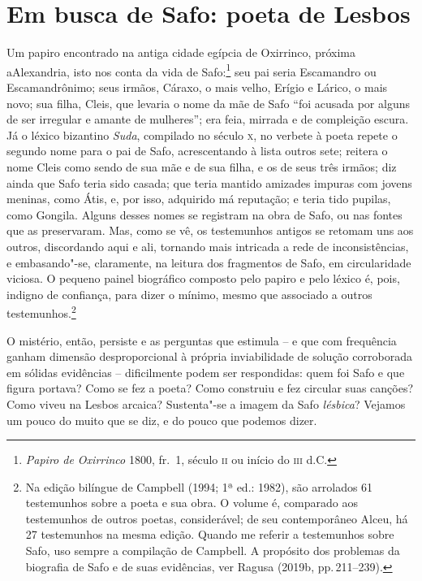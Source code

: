 \section*{Em busca de Safo: poeta de Lesbos}

Um papiro encontrado na antiga cidade egípcia de Oxirrinco, próxima a\EP[]
Alexandria, isto nos conta da vida de Safo:\footnote{\textit{Papiro de Oxirrinco} 1800,
fr.~1, século \textsc{ii} ou início do \textsc{iii} d.C.} seu pai seria Escamandro ou
Escamandrônimo; seus irmãos, Cáraxo, o mais velho, Erígio e Lárico, o mais
novo; sua filha, Cleis, que levaria o nome da mãe de Safo ``foi acusada
por alguns de ser irregular e amante de mulheres”; era feia, mirrada e de
compleição escura. Já o léxico bizantino \textit{Suda}, compilado no século \textsc{x},
no verbete à poeta repete o segundo nome para o pai de Safo, acrescentando à
lista outros sete; reitera o nome Cleis como sendo de sua mãe e de sua filha, e
os de seus três irmãos; diz ainda que Safo teria sido casada; que teria mantido
amizades impuras com jovens meninas, como Átis, e, por isso, adquirido má
reputação; e teria tido pupilas, como Gongila. Alguns desses nomes se registram
na obra de Safo, ou nas fontes que as preservaram. Mas, como se vê, os
testemunhos antigos se retomam uns aos outros, discordando aqui e ali, tornando
mais intricada a rede de inconsistências, e embasando"-se, claramente, na
leitura dos fragmentos de Safo, em circularidade viciosa. O pequeno painel
biográfico composto pelo papiro e pelo léxico é, pois, indigno de confiança,
para dizer o mínimo, mesmo que associado a outros testemunhos.\footnote{ Na
edição bilíngue de Campbell (1994; 1ª ed.: 1982), são arrolados 61 testemunhos
sobre a poeta e sua obra. O volume é, \mbox{comparado} aos testemunhos de outros
poetas, considerável; de seu contemporâneo Alceu, há 27 testemunhos na mesma edição. 
Quando me referir a testemunhos sobre Safo, uso
sempre a compilação de Campbell. A propósito dos problemas da biografia de Safo e de suas evidências, ver Ragusa (2019b, pp.\,211--239).}

O mistério, então, persiste e as perguntas que estimula -- e que com frequência
ganham dimensão desproporcional à própria inviabilidade de solução
corroborada em sólidas evidências -- dificilmente podem ser respondidas: quem
foi Safo e que figura portava? Como se fez a poeta? Como construiu e fez
circular suas canções? Como viveu na Lesbos arcaica? Sustenta"-se a imagem da
Safo \textit{lésbica}? Vejamos um pouco do muito que se diz, e do
pouco que podemos dizer.


